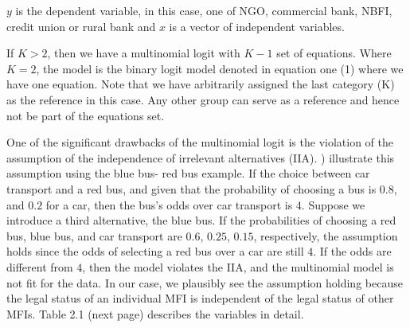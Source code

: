 \documentclass[a4paper, nobind]{templates/ociamthesis}
\begin{document}
\(y\) is the dependent variable, in this case, one of NGO, commercial bank, NBFI, credit union or rural bank and \(x\) is a vector of independent variables.

If \(K>2\), then we have a multinomial logit with \(K-1\) set of equations. Where \(K=2\), the model is the binary logit model denoted in equation one (1) where we have one equation. Note that we have arbitrarily assigned the last category (K) as the reference in this case. Any other group can serve as a reference and hence not be part of the equations set.

One of the significant drawbacks of the multinomial logit is the violation of the assumption of the independence of irrelevant alternatives (IIA). \textcite{cheng2007testing} ) illustrate this assumption using the blue bus- red bus example. If the choice between car transport and a red bus, and given that the probability of choosing a bus is \(0.8\), and \(0.2\) for a car, then the bus's odds over car transport is 4. Suppose we introduce a third alternative, the blue bus. If the probabilities of choosing a red bus, blue bus, and car transport are \(0.6\), \(0.25\), \(0.15\), respectively, the assumption holds since the odds of selecting a red bus over a car are still \(4\). If the odds are different from \(4\), then the model violates the IIA, and the multinomial model is not fit for the data. In our case, we plausibly see the assumption holding because the legal status of an individual MFI is independent of the legal status of other MFIs. Table 2.1 (next page) describes the variables in detail.
\end{document}

